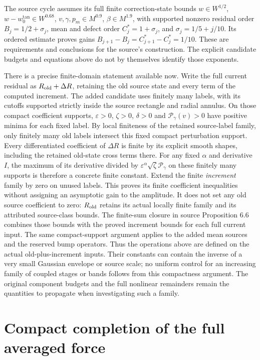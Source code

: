 \documentclass[11pt]{article}
\begin{document}
The source cycle assumes its full finite correction-state bounds
$w\in W^{1/2}$, $w-w_0^{\tan}\in W^{0.68}$,
$v,\gamma,p_m\in M^{0.9}$, $\beta\in M^{1.9}$,
with supported nonzero residual order
$B_j=1/2+\sigma_j$, mean and defect order $C_j^*=1+\sigma_j$,
and $\sigma_j=1/5+j/10$. Its ordered estimate proves gains
$B_{j+1}-B_j=C_{j+1}^*-C_j^*=1/10$.
These are requirements and conclusions for the source's construction.
The explicit candidate budgets and equations above do not by
themselves identify those exponents.

There is a precise finite-domain statement available now. Write the
full current residual as $R_{\rm old}+\Delta R$, retaining the old
source state and every term of the computed increment. The added
candidate uses finitely many labels, with its cutoffs supported
strictly inside the source rectangle and radial annulus. On those
compact coefficient supports, $\varepsilon>0$, $\zeta>0$,
$\delta>0$ and $\mathcal P_\gamma(v)>0$ have positive minima
for each fixed label. By local finiteness of the retained source-label
family, only finitely many old labels intersect this fixed compact
perturbation support. Every differentiated coefficient of $\Delta R$
is finite by its explicit smooth shapes, including the retained old-state
cross terms there. For any fixed
$\alpha$ and derivative $I$, the maximum of its derivative divided by
$\varepsilon^\alpha\sqrt\zeta\mathcal P_\gamma$ on these finitely
many supports is therefore a concrete finite constant. Extend the
finite \emph{increment} family by zero on unused labels. This proves its
finite coefficient inequalities without assigning an asymptotic gain
to the amplitude. It does not set any old source coefficient to zero:
$R_{\rm old}$ retains its actual locally finite family and its attributed
source-class bounds. The finite-sum closure in source Proposition 6.6
combines those bounds with the proved increment bounds for each full
current input. The same compact-support argument applies to the added
mean sources and the reserved bump operators. Thus the operations
above are defined on the actual old-plus-increment inputs.
Their constants can contain the inverse of a very small Gaussian
envelope or source scale; no uniform control for an increasing family
of coupled stages or bands follows from this compactness argument.
The original component budgets and the full nonlinear remainders
remain the quantities to propagate when investigating such a family.

\clearpage\part{Compact completion of the full averaged force}
\end{document}

